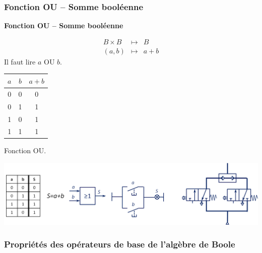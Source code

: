 \documentclass[10pt,fleqn]{article} %
\begin{document}
\subsubsection{Fonction OU -- Somme booléenne}


\begin{defi}
\textbf{Fonction OU -- Somme booléenne}

\begin{minipage}[c]{.45\linewidth}
\begin{eqnarray*}
B \times B &\longmapsto& B\\
(a,b) &\longmapsto& a + b
\end{eqnarray*}
Il faut lire $a$ OU $b$. 
\end{minipage} \hfill
\begin{minipage}[c]{.45\linewidth}
\begin{center}
\begin{tabular}{|c|c||c|}
\hline
$a$ & $b$ & $a+ b$ \\
\hline
0 & 0 & 0 \\ \hline
0 & 1 & 1 \\ \hline
1 & 0 & 1 \\ \hline
1 & 1 & 1 \\ \hline
\end{tabular}
\end{center}
\end{minipage}
\end{defi}

\begin{exemple}
Fonction OU.


\begin{center}
\includegraphics[width=.9\textwidth]{images/OU}
\end{center}
\end{exemple}

\subsubsection{Propriétés des opérateurs de base de l'algèbre de Boole}
\end{document}
